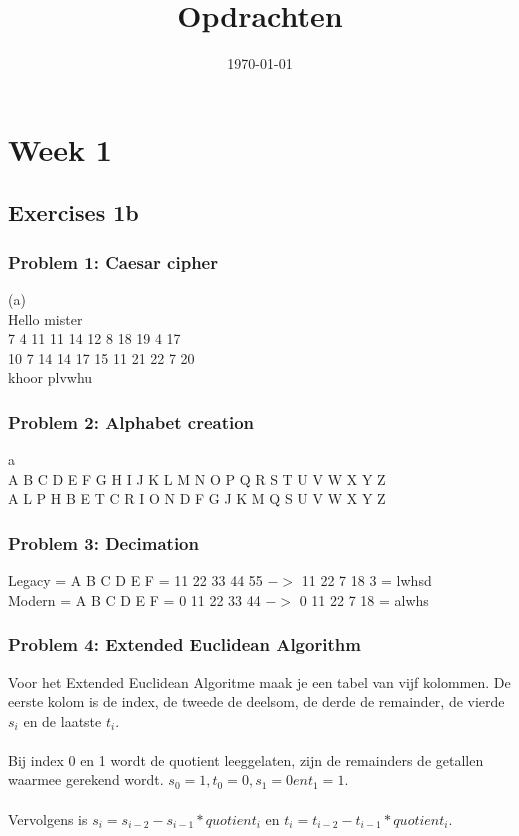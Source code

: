 \documentclass{uva-inf-article}
\title{Opdrachten}
\date{\today}
\begin{document}
\maketitle


\section{Week 1}
\subsection{Exercises 1b}
\subsubsection{Problem 1: Caesar cipher}
(a)\\ 
Hello mister \\
7 4 11 11 14 12 8 18 19 4 17 \\
10 7 14 14 17 15 11 21 22 7 20\\
khoor plvwhu

\subsubsection{Problem 2: Alphabet creation}
a\\
A B C D E F G H I J K L M N O P Q R S T U V W X Y Z\\
A L P H B E T C R I O N D F G J K M Q S U V W X Y Z\\

\subsubsection{Problem 3: Decimation}
Legacy = A B C D E F = 11 22 33 44 55 $->$ 11 22 7 18 3 = lwhsd\\
Modern = A B C D E F = 0 11 22 33 44 $->$ 0 11 22 7 18 = alwhs\\

\subsubsection{Problem 4: Extended Euclidean Algorithm}
Voor het Extended Euclidean Algoritme maak je een tabel van vijf kolommen. De
eerste kolom is de index, de tweede de deelsom, de derde de remainder, de vierde
$s_{i}$ en de laatste $t_{i}$.\\\\
Bij index 0 en 1 wordt de quotient leeggelaten, zijn de remainders de getallen
waarmee gerekend wordt. $s_{0} = 1, t_{0} = 0, s_{1} = 0 en t_{1} = 1$.\\\\
Vervolgens is $s_{i} = s_{i-2} - s_{i-1} * quotient_{i}$ en $t_{i} = t_{i-2} - 
t_{i-1} * quotient_{i}$.
\end{document}
